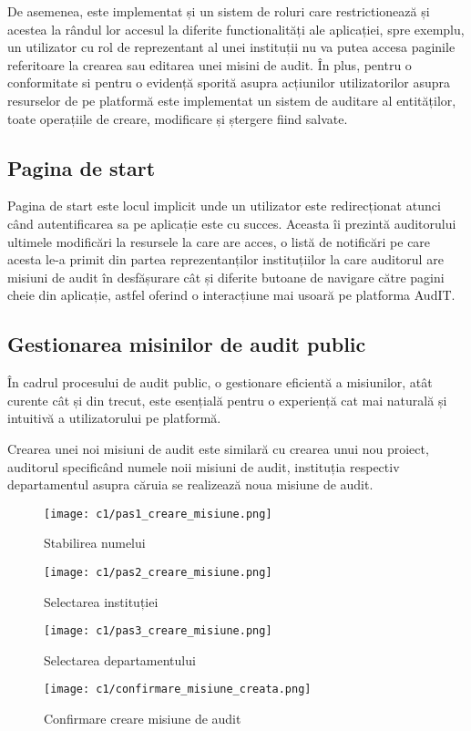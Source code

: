 De asemenea, este implementat și un sistem de roluri care restrictionează și acestea la rândul lor accesul la diferite functionalități ale aplicației, spre exemplu, un utilizator cu rol de reprezentant al unei instituții nu va putea accesa paginile referitoare la crearea sau editarea unei misini de audit.
În plus, pentru o conformitate si pentru o evidență sporită asupra acțiunilor utilizatorilor asupra resurselor de pe platformă este implementat un sistem de auditare al entităților, toate operațiile de creare, modificare și ștergere fiind salvate.

\subsection{Pagina de start}
Pagina de start este locul implicit unde un utilizator este redirecționat atunci când autentificarea sa pe aplicație este cu succes. Aceasta îi prezintă auditorului ultimele modificări la resursele la care are acces, o listă de notificări pe care acesta le-a primit din partea reprezentanților instituțiilor la care auditorul are misiuni de audit în desfășurare cât și diferite butoane de navigare către pagini cheie din aplicație, astfel oferind o interacțiune mai usoară pe platforma AudIT.

\subsection{Gestionarea misinilor de audit public}
În cadrul procesului de audit public, o gestionare eficientă a misiunilor, atât curente cât și din trecut, este esențială pentru o experiență cat mai naturală și intuitivă a utilizatorului pe platformă.

Crearea unei noi misiuni de audit este similară cu crearea unui nou proiect, auditorul specificând numele noii misiuni de audit, instituția respectiv departamentul asupra căruia se realizează noua misiune de audit.

	\vspace{0.5 cm}
\begin{figure}[h]
	\centering
	\begin{minipage}{.5\textwidth}
		\centering
		\texttt{[image: c1/pas1\_creare\_misiune.png]}
		\caption{Stabilirea numelui}
		
	\end{minipage}%
	\begin{minipage}{.5\textwidth}
		\centering
		\texttt{[image: c1/pas2\_creare\_misiune.png]}
		\caption{Selectarea instituției}
	
	\end{minipage}
	\vspace{0.5 cm}

	\centering
	
	\texttt{[image: c1/pas3\_creare\_misiune.png]}
		\vspace{0.5 cm}
	\caption{Selectarea departamentului}
	
	\texttt{[image: c1/confirmare\_misiune\_creata.png]}
	\caption{Confirmare creare misiune de audit}
	
\end{figure}


